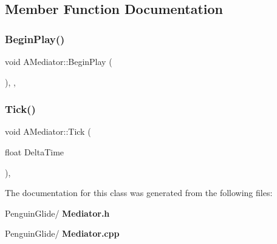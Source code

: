 \subsection{Member Function Documentation}
\mbox{\label{class_a_mediator_a38f517caf18f995be52213027d5ddb50}} 
\subsubsection{BeginPlay()}
{\footnotesize\ttfamily void A\+Mediator\+::\+Begin\+Play (\begin{DoxyParamCaption}{ }\end{DoxyParamCaption})\hspace{0.3cm}{\ttfamily [override]}, {\ttfamily [protected]}, {\ttfamily [virtual]}}

\mbox{\label{class_a_mediator_a4ad36047076d18725da7bfdcc0fc9130}} 
\subsubsection{Tick()}
{\footnotesize\ttfamily void A\+Mediator\+::\+Tick (\begin{DoxyParamCaption}\item[{float}]{Delta\+Time }\end{DoxyParamCaption})\hspace{0.3cm}{\ttfamily [override]}, {\ttfamily [virtual]}}



The documentation for this class was generated from the following files\+:\begin{DoxyCompactItemize}
\item 
Penguin\+Glide/\textbf{ Mediator.\+h}\item 
Penguin\+Glide/\textbf{ Mediator.\+cpp}\end{DoxyCompactItemize}
